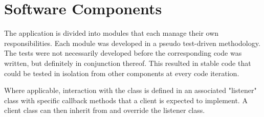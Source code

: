 \section{Software Components}

The application is divided into modules that each manage their own responsibilities. Each module was developed in a pseudo test-driven methodology. The tests were not necessarily developed before the corresponding code was written, but definitely in conjunction thereof. This resulted in stable code that could be tested in isolation from other components at every code iteration.

 Where applicable, interaction with the class is defined in an associated "listener" class with specific callback methods that a client is expected to implement. A client class can then inherit from and override the listener class.

